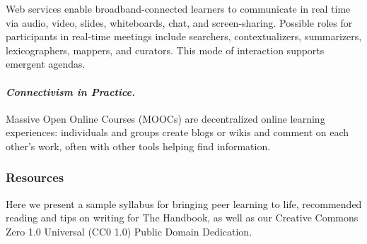 Web services enable broadband-connected learners to communicate in real
time via audio, video, slides, whiteboards, chat, and screen-sharing.
Possible roles for participants in real-time meetings include searchers,
contextualizers, summarizers, lexicographers, mappers, and curators.
This mode of interaction supports emergent agendas.

\paragraph{\emph{Connectivism in
Practice.}}\label{connectivism-in-practice.}

Massive Open Online Courses (MOOCs) are decentralized online learning
experiences: individuals and groups create blogs or wikis and comment on
each other's work, often with other tools helping find information.

\subsubsection{Resources}\label{resources}

Here we present a sample syllabus for bringing peer learning to life,
recommended reading and tips on writing for The Handbook, as well as our
Creative Commons Zero 1.0 Universal (CC0 1.0) Public Domain Dedication.
